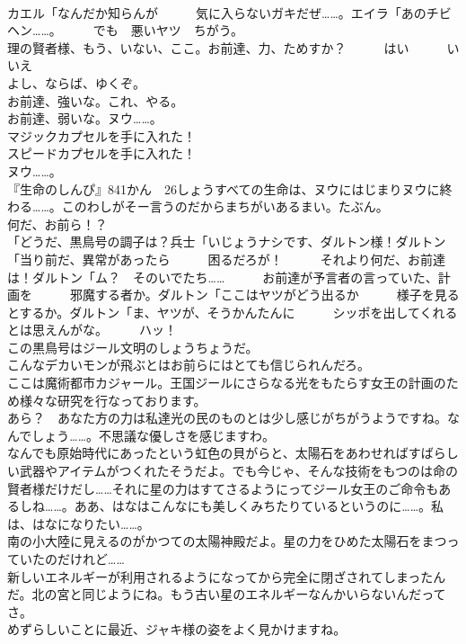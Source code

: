 \documentclass[8pt]{extreport}
\begin{document}
\begin{CJK}{UTF8}{min}
\\	カエル「なんだか知らんが　　　気に入らないガキだぜ……。エイラ「あのチビ　ヘン……。　　　でも　悪いヤツ　ちがう。	
\\	理の賢者様、もう、いない、ここ。お前達、力、ためすか？　　　はい　　　いいえ	
\\	よし、ならば、ゆくぞ。	
\\	お前達、強いな。これ、やる。	
\\	お前達、弱いな。ヌウ……。	
\\	マジックカプセルを手に入れた！	
\\	スピードカプセルを手に入れた！	
\\	ヌウ……。	
\\	『生命のしんぴ』841かん　26しょうすべての生命は、ヌウにはじまりヌウに終わる……。このわしがそー言うのだからまちがいあるまい。たぶん。	
\\	何だ、お前ら！？	
\\	「どうだ、黒鳥号の調子は？兵士「いじょうナシです、ダルトン様！ダルトン「当り前だ、異常があったら　　　困るだろが！　　　それより何だ、お前達は！ダルトン「ム？　そのいでたち……　　　お前達が予言者の言っていた、計画を　　　邪魔する者か。ダルトン「ここはヤツがどう出るか　　　様子を見るとするか。ダルトン「ま、ヤツが、そうかんたんに　　　シッポを出してくれるとは思えんがな。　　　ハッ！	
\\	この黒鳥号はジール文明のしょうちょうだ。 
\\	こんなデカいモンが飛ぶとはお前らにはとても信じられんだろ。	
\\	ここは魔術都市カジャール。王国ジールにさらなる光をもたらす女王の計画のため様々な研究を行なっております。	
\\	あら？　あなた方の力は私達光の民のものとは少し感じがちがうようですね。なんでしょう……。不思議な優しさを感じますわ。	
\\	なんでも原始時代にあったという虹色の貝がらと、太陽石をあわせればすばらしい武器やアイテムがつくれたそうだよ。でも今じゃ、そんな技術をもつのは命の賢者様だけだし……それに星の力はすてさるようにってジール女王のご命令もあるしね……。ああ、はなはこんなにも美しくみちたりているというのに……。私は、はなになりたい……。	
\\	南の小大陸に見えるのがかつての太陽神殿だよ。星の力をひめた太陽石をまつっていたのだけれど……	
\\	新しいエネルギーが利用されるようになってから完全に閉ざされてしまったんだ。北の宮と同じようにね。もう古い星のエネルギーなんかいらないんだってさ。	
\\	めずらしいことに最近、ジャキ様の姿をよく見かけますね。	

\end{CJK}
\end{document}
